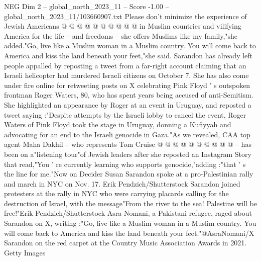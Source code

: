 \begin{textsample}{NEG Dim 2 – global\_north\_2023\_11 – Score -1.00 – global\_north\_2023\_11/103660907.txt}
Please don't minimize the experience of Jewish Americans @ @ @ @ @ @ @ @ @ @ in Muslim countries and vilifying America for the life -- and freedoms -- she offers Muslims like my family,"she added."Go, live like a Muslim woman in a Muslim country.
You will come back to America and kiss the land beneath your feet,"she said.
Sarandon has already left people appalled by reposting a tweet from a far-right account claiming that an Israeli helicopter had murdered Israeli citizens on October 7.
She has also come under fire online for retweeting posts on X celebrating Pink Floyd ' s outspoken frontman Roger Waters, 80, who has spent years being accused of anti-Semitism.
She highlighted an appearance by Roger at an event in Uruguay, and reposted a tweet saying :"Despite attempts by the Israeli lobby to cancel the event, Roger Waters of Pink Floyd took the stage in Uruguay, donning a Kufiyyah and advocating for an end to the Israeli genocide in Gaza."As we revealed, CAA top agent Maha Dakhil -- who represents Tom Cruise @ @ @ @ @ @ @ @ @ @ -- has been on a"listening tour"of Jewish leaders after she reposted an Instagram Story that read,"You ' re currently learning who supports genocide,"adding :"that ' s the line for me."Now on Decider Susan Sarandon spoke at a pro-Palestinian rally and march in NYC on Nov. 17.
Erik Pendzich/Shutterstock Sarandon joined protesters at the rally in NYC who were carrying placards calling for the destruction of Israel, with the message"From the river to the sea!
Palestine will be free!"Erik Pendzich/Shutterstock Asra Nomani, a Pakistani refugee, raged about Sarandon on X, writing :"Go, live like a Muslim woman in a Muslim country.
You will come back to America and kiss the land beneath your feet."@AsraNomani/X Sarandon on the red carpet at the Country Music Association Awards in 2021.
Getty Images

\end{textsample}
